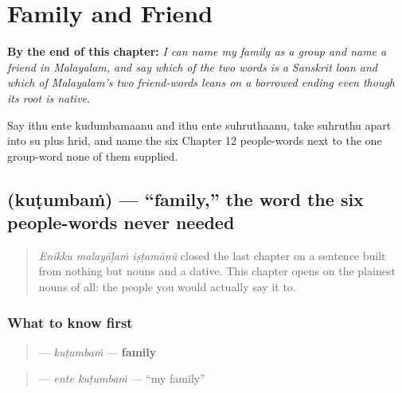 
\chapter{Family and Friend}
\label{ch:ml-family-and-friend}

\begin{chapteropening}
\textbf{By the end of this chapter:} \emph{I can name my family as a group and name a friend in Malayalam, and say which of the two words is a Sanskrit loan and which of Malayalam's two friend-words leans on a borrowed ending even though its root is native.}

Say ithu ente kudumbamaanu and ithu ente suhruthaanu, take suhruthu apart into su plus hrid, and name the six Chapter 12 people-words next to the one group-word none of them supplied.
\end{chapteropening}

\section[\texorpdfstring{\ml{കുടുംബം} (kuṭumbaṁ)}{കുടുംബം (kuṭumbaṁ)}]{ (kuṭumbaṁ) — \textquotedblleft{}family,\textquotedblright{} the word the six people-words never needed}

\label{lesson:ML-C35-kudumbam}



\begin{quote}
\emph{Enikku malayāḷaṁ iṣṭamāṇŭ} closed the last chapter on a sentence built from nothing but nouns and a dative. This chapter opens on the plainest nouns of all: the people you would actually say it to.
\end{quote}

\subsection*{What to know first}
\begin{quote}
\textbf{} — \emph{kuṭumbaṁ} — \textbf{family}
\end{quote}

\begin{quote}
\textbf{ } — \emph{ente kuṭumbaṁ} — \textquotedblleft{}my family\textquotedblright{}
\end{quote}

